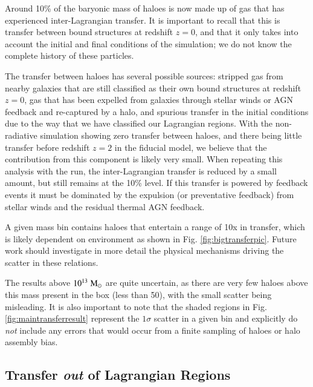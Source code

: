 Around 10\% of the baryonic mass of haloes is now made up of gas that has
experienced inter-Lagrangian transfer. It is important to recall that this is transfer
between bound structures at redshift $z=0$, and that it only takes into account
the initial and final conditions of the simulation; we do not know the complete history
of these particles.

The transfer between haloes has several possible sources: stripped gas from
nearby galaxies that are still classified as their own bound structures at
redshift $z=0$, gas that has been expelled from galaxies through stellar
winds or AGN feedback and re-captured by a halo, and spurious transfer in the
initial conditions due to the way that we have classified our Lagrangian
regions. With the non-radiative simulation showing zero transfer between
haloes, and there being little transfer before redshift $z=2$ in the fiducial
model, we believe that the contribution from this component is likely very
small. When repeating this analysis with the \nojet{} run, the
inter-Lagrangian transfer is reduced by a small amount, but still remains at
the 10\% level. If this transfer is powered by feedback events it must be
dominated by the expulsion (or preventative feedback) from stellar winds and
the residual thermal AGN feedback.

A given mass bin contains haloes that entertain a range of 10x in transfer,
which is likely dependent on environment as shown in Fig.
\ref{fig:bigtransferpic}. Future work should investigate in more detail
the physical mechanisms driving the scatter in these relations.

The results above $10^{13} \;{\rm M}_{\odot}{}$ are quite uncertain, as there are
very few haloes above this mass present in the box (less than 50), with the
small scatter being misleading. It is also important to note that the shaded
regions in Fig. \ref{fig:maintransferresult} represent the $1\sigma$
scatter in a given bin and explicitly do \emph{not} include any errors that
would occur from a finite sampling of haloes or halo assembly bias.

\subsection{Transfer \emph{out} of Lagrangian Regions}

